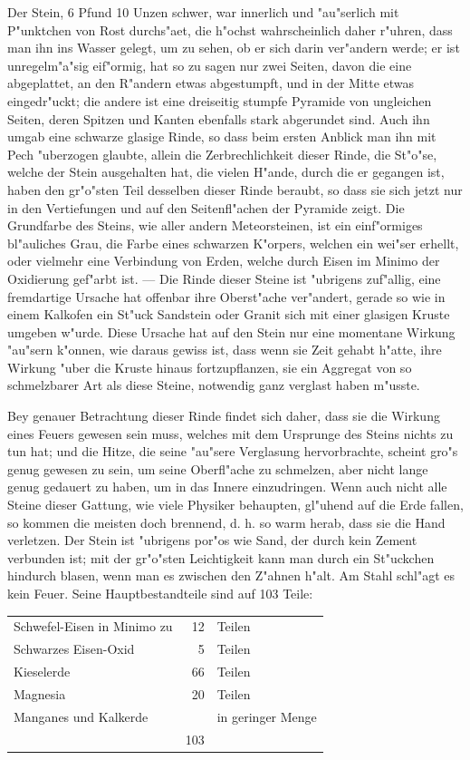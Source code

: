 \documentclass[a4paper, 11pt, oneside, polutonikogreek, german]{article}
\begin{document}
Der Stein, 6 Pfund 10 Unzen schwer, war innerlich und "au"serlich mit P"unktchen von Rost durchs"aet, die h"ochst wahrscheinlich daher r"uhren, dass man ihn ins Wasser gelegt, um zu sehen, ob er sich darin ver"andern werde; er ist unregelm"a"sig eif"ormig, hat so zu sagen nur zwei Seiten, davon die eine abgeplattet, an den R"andern etwas abgestumpft, und in der Mitte etwas eingedr"uckt; die andere ist eine dreiseitig stumpfe Pyramide von ungleichen Seiten, deren Spitzen und Kanten ebenfalls stark abgerundet sind. Auch ihn umgab eine schwarze glasige Rinde, so dass beim ersten Anblick man ihn mit Pech "uberzogen glaubte, allein die Zerbrechlichkeit dieser Rinde, die St"o"se, welche der Stein ausgehalten hat, die vielen H"ande, durch die er gegangen ist, haben den gr"o"sten Teil desselben dieser Rinde beraubt, so dass sie sich jetzt nur in den Vertiefungen und auf den Seitenfl"achen der Pyramide zeigt. Die Grundfarbe des Steins, wie aller andern Meteorsteinen, ist ein einf"ormiges bl"auliches Grau, die Farbe eines schwarzen K"orpers, welchen ein wei"ser erhellt, oder vielmehr eine Verbindung von Erden, welche durch Eisen im Minimo der Oxidierung gef"arbt ist. --- Die Rinde dieser Steine ist "ubrigens zuf"allig, eine fremdartige Ursache hat offenbar ihre Oberst"ache ver"andert, gerade so wie in einem Kalkofen ein St"uck Sandstein oder Granit sich mit einer glasigen Kruste umgeben w"urde. Diese Ursache hat auf den Stein nur eine momentane Wirkung "au"sern k"onnen, wie daraus gewiss ist, dass wenn sie Zeit gehabt h"atte, ihre Wirkung "uber die Kruste hinaus fortzupflanzen, sie ein Aggregat von so schmelzbarer Art als diese Steine, notwendig ganz verglast haben m"usste.

Bey genauer Betrachtung dieser Rinde findet sich daher, dass sie die Wirkung eines Feuers gewesen sein muss, welches mit dem Ursprunge des Steins nichts zu tun hat; und die Hitze, die seine "au"sere Verglasung hervorbrachte, scheint gro"s genug gewesen zu sein, um seine Oberfl"ache zu schmelzen, aber nicht lange genug gedauert zu haben, um in das Innere einzudringen. Wenn auch nicht alle Steine dieser Gattung, wie viele Physiker behaupten, gl"uhend auf die Erde fallen, so kommen die meisten doch brennend, d. h. so warm herab, dass sie die Hand verletzen. Der Stein ist "ubrigens por"os wie Sand, der durch kein Zement verbunden ist; mit der gr"o"sten Leichtigkeit kann man durch ein St"uckchen hindurch blasen, wenn man es zwischen den Z"ahnen h"alt. Am Stahl schl"agt es kein Feuer. Seine Hauptbestandteile sind auf 103 Teile:
\begin{table}[H]
    \centering
    \begin{tabular}{l r l}
        Schwefel-Eisen in Minimo zu & 12 & Teilen \\
        Schwarzes Eisen-Oxid & 5 & Teilen \\
        Kieselerde & 66 & Teilen \\
        Magnesia & 20 & Teilen \\
        Manganes und Kalkerde & ~ & in geringer Menge \\ \hline
         ~ & 103 & ~ \\ 
    \end{tabular}
\end{table}
\end{document}

